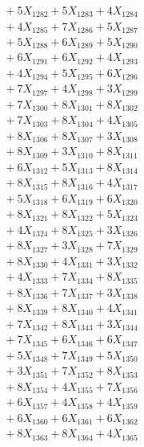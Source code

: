 \documentclass[a4paper,10pt]{article}
\begin{document}
{\begin{align}
&\;  + 5 X_{1282} + 5 X_{1283} + 4 X_{1284} \\[0.3ex]
&\;  + 4 X_{1285} + 7 X_{1286} + 5 X_{1287} \\[0.3ex]
&\;  + 5 X_{1288} + 6 X_{1289} + 5 X_{1290} \\[0.3ex]
&\;  + 6 X_{1291} + 6 X_{1292} + 4 X_{1293} \\[0.3ex]
&\;  + 4 X_{1294} + 5 X_{1295} + 6 X_{1296} \\[0.3ex]
&\;  + 7 X_{1297} + 4 X_{1298} + 3 X_{1299} \\[0.5ex]\allowbreak
&\;  + 7 X_{1300} + 8 X_{1301} + 8 X_{1302} \\[0.3ex]
&\;  + 7 X_{1303} + 8 X_{1304} + 4 X_{1305} \\[0.3ex]
&\;  + 8 X_{1306} + 8 X_{1307} + 3 X_{1308} \\[0.3ex]
&\;  + 8 X_{1309} + 3 X_{1310} + 8 X_{1311} \\[0.3ex]
&\;  + 6 X_{1312} + 5 X_{1313} + 8 X_{1314} \\[0.3ex]
&\;  + 8 X_{1315} + 8 X_{1316} + 4 X_{1317} \\[0.3ex]
&\;  + 5 X_{1318} + 6 X_{1319} + 6 X_{1320} \\[0.3ex]
&\;  + 8 X_{1321} + 8 X_{1322} + 5 X_{1323} \\[0.3ex]
&\;  + 4 X_{1324} + 8 X_{1325} + 3 X_{1326} \\[0.3ex]
&\;  + 8 X_{1327} + 3 X_{1328} + 7 X_{1329} \\[0.5ex]\allowbreak
&\;  + 8 X_{1330} + 4 X_{1331} + 3 X_{1332} \\[0.3ex]
&\;  + 4 X_{1333} + 7 X_{1334} + 8 X_{1335} \\[0.3ex]
&\;  + 8 X_{1336} + 7 X_{1337} + 3 X_{1338} \\[0.3ex]
&\;  + 8 X_{1339} + 8 X_{1340} + 4 X_{1341} \\[0.3ex]
&\;  + 7 X_{1342} + 8 X_{1343} + 3 X_{1344} \\[0.3ex]
&\;  + 7 X_{1345} + 6 X_{1346} + 6 X_{1347} \\[0.3ex]
&\;  + 5 X_{1348} + 7 X_{1349} + 5 X_{1350} \\[0.3ex]
&\;  + 3 X_{1351} + 7 X_{1352} + 8 X_{1353} \\[0.3ex]
&\;  + 8 X_{1354} + 4 X_{1355} + 7 X_{1356} \\[0.3ex]
&\;  + 6 X_{1357} + 4 X_{1358} + 4 X_{1359} \\[0.5ex]\allowbreak
&\;  + 6 X_{1360} + 6 X_{1361} + 6 X_{1362} \\[0.3ex]
&\;  + 8 X_{1363} + 8 X_{1364} + 4 X_{1365} \\[0.3ex]

\end{align}}
\end{document}
